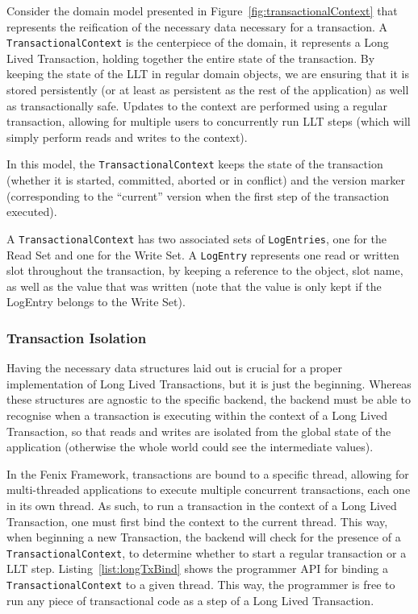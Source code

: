 \documentclass{llncs}
\begin{document}
Consider the domain model presented in
Figure~\ref{fig:transactionalContext} that represents the reification
of the necessary data necessary for a transaction. A
\texttt{TransactionalContext} is the centerpiece of the domain, it
represents a Long Lived Transaction, holding together the entire state
of the transaction. By keeping the state of the LLT in regular domain
objects, we are ensuring that it is stored persistently (or at least
as persistent as the rest of the application) as well as
transactionally safe. Updates to the context are performed using a
regular transaction, allowing for multiple users to concurrently run
LLT steps (which will simply perform reads and writes to the context).

In this model, the \texttt{TransactionalContext} keeps the state of
the transaction (whether it is started, committed, aborted or in
conflict) and the version marker (corresponding to the ``current''
version when the first step of the transaction executed).

A \texttt{TransactionalContext} has two associated sets of
\texttt{LogEntries}, one for the Read Set and one for the Write Set. A
\texttt{LogEntry} represents one read or written slot throughout the
transaction, by keeping a reference to the object, slot name, as well
as the value that was written (note that the value is only kept if the
LogEntry belongs to the Write Set).

\subsubsection{Transaction Isolation}

Having the necessary data structures laid out is crucial for a proper
implementation of Long Lived Transactions, but it is just the
beginning. Whereas these structures are agnostic to the specific
backend, the backend must be able to recognise when a transaction is
executing within the context of a Long Lived Transaction, so that
reads and writes are isolated from the global state of the application
(otherwise the whole world could see the intermediate values).

In the Fenix Framework, transactions are bound to a specific thread,
allowing for multi-threaded applications to execute multiple
concurrent transactions, each one in its own thread. As such, to run a
transaction in the context of a Long Lived Transaction, one must first
bind the context to the current thread. This way, when beginning a new
Transaction, the backend will check for the presence of a
\texttt{TransactionalContext}, to determine whether to start a regular
transaction or a LLT step. Listing~\ref{list:longTxBind} shows the
programmer API for binding a \texttt{TransactionalContext} to a given
thread. This way, the programmer is free to run any piece of
transactional code as a step of a Long Lived Transaction.
\end{document}
